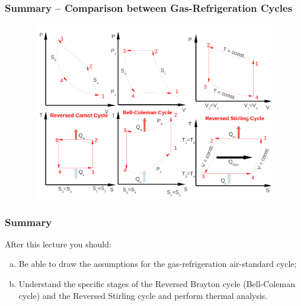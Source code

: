 \documentclass[10pt,compress]{beamer}
\begin{document}
\begin{frame}
 \frametitle{Summary -- Comparison between Gas-Refrigeration Cycles}

    \begin{figure}%
     \begin{center}
      \includegraphics[width=11.5cm,height=7.8cm]{./Pics/Overview_Refrig10}
     \end{center}
    \end{figure}  

\end{frame}

\begin{frame}
 \frametitle{Summary}
  After this lecture you should:
 \begin{enumerate}[(a)]
  \item <1-> Be able to draw the assumptions for the gas-refrigeration air-standard cycle;
  \item <2-> Understand the specific stages of the Reversed Brayton cycle (Bell-Coleman cycle) and the Reversed Stirling cycle and perform thermal analysis.
 \end{enumerate}
\end{frame}
\end{document}

